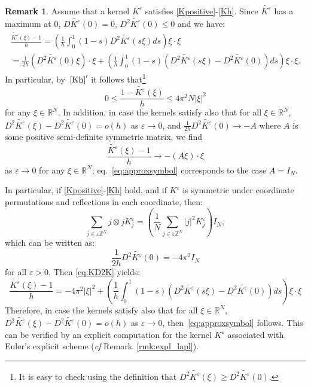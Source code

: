 \documentclass[10pt]{amsart}
\theoremstyle{plain}
\theoremstyle{definition}
\newtheorem{remark}[theorem]{Remark}
\newcommand{\R}{\mathbb{R}}
\newcommand{\Z}{\mathbb{Z}}
\newcommand{\e}{\varepsilon}
\numberwithin{equation}{section}
\begin{document}
\begin{remark}\label{rmk:symmetries}
  {Assume that a kernel $K^\e$ satisfies \eqref{Kpositive}-\eqref{Kh}.} Since $\widetilde{K^\e}$ has a maximum at $0$, $D\widetilde{K^\e}(0)=0$,
$D^2\widetilde{K^\e}(0)\le 0$ and we have:
\begin{multline} \label{eq:KD2K}
  \frac{\widetilde{K^\e}(\xi)-1}{h} = \left(\frac{1}{h}\int_0^1 (1-s)D^2\widetilde{K^\e}(s\xi)ds\right)\xi\cdot\xi
  \\ 
  = \frac{1}{2h}\left(D^2\widetilde{K^\e}(0)\xi\right)\cdot\xi + \left(\frac{1}{h}\int_0^1 (1-s)(D^2\widetilde{K^\e}(s\xi)-D^2\widetilde{K^\e}(0))ds\right)\xi\cdot\xi.
\end{multline}
In particular, by~$\eqref{Kh}'$ it follows that\footnote{It is easy to check using the definition that $D^2\widetilde{K^\e}(\xi)\ge D^2\widetilde{K^\e}(0)$.}
\begin{equation}\label{eq:boundsymbol}
  0\le \frac{1-\widetilde{K^\e}(\xi)}{h}\le 4\pi^2 N |\xi|^2
\end{equation}
for any $\xi\in\R^N$. In addition, in case the kernels satisfy also that for all $\xi\in\R^N$,
  $D^2\widetilde{K^\e}(\xi)-D^2\widetilde{K^\e}(0)=o(h)$
  as $\e\to 0$, and $\frac{1}{2h}D^2\widetilde{K^\e}(0)\to -A$ where $A$ is some positive semi-definite
  symmetric matrix, we find
  \[
    \frac{\widetilde{K^\e}(\xi)-1}{h} \to - (A\xi)\cdot\xi
  \]
  as $\e\to 0$ for any $\xi\in\R^N$; eq.~\eqref{eq:approxsymbol} corresponds to the case $A=I_N$.
  
     {In particular, if \eqref{Kpositive}-\eqref{Kh} hold, and if $K^\e$ is symmetric under coordinate permutations and reflections in each coordinate, then:}
\[
  \sum_{j\in\e\Z^N} j\otimes j K^\e_j = \left(\frac{1}{N}\sum_{j\in\e\Z^N} |j|^2K^\e_j  \right)I_N,
\]
which can be written as:
\begin{equation}\label{eq:symK}
  \frac{1}{2h} D^2 \widetilde{K^\e}(0) = -4\pi^2 I_N
\end{equation}
for all $\e>0$. Then \eqref{eq:KD2K} yields:
   \[
   \frac{\widetilde{K^\e}(\xi)-1}{h}  
    = -4\pi^2|\xi|^2 + \left(\frac{1}{h}\int_0^1 (1-s)(D^2\widetilde{K^\e}(s\xi)-D^2\widetilde{K^\e}(0))ds\right)\xi\cdot\xi
  \]
  Therefore, in case the kernels satisfy also that for all $\xi\in\R^N$,
  $D^2\widetilde{K^\e}(\xi)-D^2\widetilde{K^\e}(0)=o(h)$
  as $\e\to 0$, then~\eqref{eq:approxsymbol} follows.   {This can be verified by an explicit computation for the kernel $K^\e$ associated with Euler's explicit scheme (\textit{cf} Remark~\ref{rmk:expl_lapl}).}
\end{remark}
 
\end{document}
